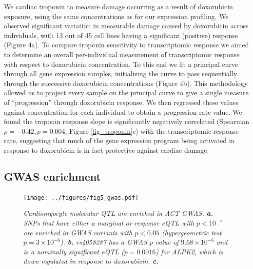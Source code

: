 \documentclass{article}
\begin{document}
{We cardiac troponin to measure damage occurring as a result of doxorubicin exposure, using the same concentrations as for our expression profiling. We observed significant variation in measurable damage caused by doxorubicin across individuals, with 13 out of 45 cell lines having a significant (positive) response (Figure 4a). To compare troponin sensitivity to transcriptomic response we aimed to determine an overall per-individual measurement of transcriptomic response with respect to doxorubicin concentration. To this end we fit a principal curve\citep{princurve} through all gene expression samples, initializing the curve to pass sequentially through the successive doxorubicin concentrations (Figure 4b). This methodology allowed us to project every sample on the principal curve to give a single measure of ``progression'' through doxorubicin response. We then regressed these values against concentration for each individual to obtain a progression rate value. We found the troponin response slope is significantly negatively correlated (Spearman $\rho=-0.42, p=0.004$, Figure \ref{fig_troponin}c) with the transcriptomic response rate, suggesting that much of the gene expression program being activated in response to doxorubicin is in fact protective against cardiac damage. 


\subsection*{GWAS enrichment} 

\begin{figure}
\begin{center}
    \texttt{[image: ../figures/fig5\_gwas.pdf]}     \caption{\it{Cardiomyocyte molecular QTL are enriched in ACT GWAS. \textbf{a.} SNPs that have either a marginal or response eQTL with $p<10^{-5}$ are enriched in GWAS variants with $p<0.05$ (hypergeometric test $p=3 \times 10^{-6}$). \textbf{b.} rs4058287 has a GWAS $p$-value of $9.68\times 10^{-6}$ and is a nominally significant eQTL ($p=0.0016$) for ALPK2, which is down-regulated in response to doxorubicin. \textbf{c.} }}
    \label{fig:gwas}
    \end{center}
\end{figure}


}
\end{document}
